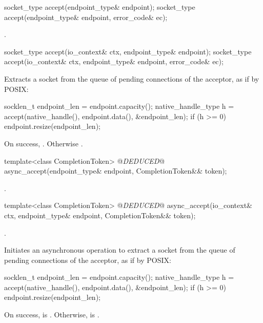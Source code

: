 \begin{itemdecl}
socket_type accept(endpoint_type& endpoint);
socket_type accept(endpoint_type& endpoint, error_code& ec);
\end{itemdecl}

\begin{itemdescr}
\pnum
\returns {}.
\end{itemdescr}

\begin{itemdecl}
socket_type accept(io_context& ctx, endpoint_type& endpoint);
socket_type accept(io_context& ctx, endpoint_type& endpoint,
                   error_code& ec);
\end{itemdecl}

\begin{itemdescr}
\pnum
\effects Extracts a socket from the queue of pending connections of the acceptor, as if by POSIX: 
\begin{codeblock}
socklen_t endpoint_len = endpoint.capacity();
native_handle_type h = accept(native_handle(),
                              endpoint.data(),
                              &endpoint_len);
if (h >= 0)
  endpoint.resize(endpoint_len);
\end{codeblock}


\pnum
\returns On success, . Otherwise .
\end{itemdescr}

\begin{itemdecl}
template<class CompletionToken>
  @\textit{DEDUCED}@ async_accept(endpoint_type& endpoint,
                       CompletionToken&& token);
\end{itemdecl}

\begin{itemdescr}
\pnum
\returns {}.
\end{itemdescr}

\begin{itemdecl}
template<class CompletionToken>
  @\textit{DEDUCED}@ async_accept(io_context& ctx, endpoint_type& endpoint,
                       CompletionToken&& token);
\end{itemdecl}

\begin{itemdescr}
\pnum
\completionsig {}.

\pnum
\effects Initiates an asynchronous operation to extract a socket from the queue of pending connections of the acceptor, as if by POSIX: 
\begin{codeblock}
socklen_t endpoint_len = endpoint.capacity();
native_handle_type h = accept(native_handle(),
                              endpoint.data(),
                              &endpoint_len);
if (h >= 0)
  endpoint.resize(endpoint_len);
\end{codeblock}
On success,  is . Otherwise,   is  .
\end{itemdescr}


